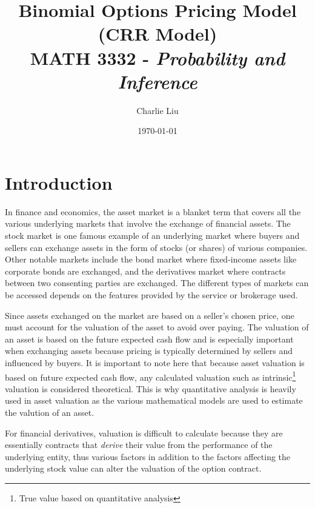 \documentclass[12pt, letterpaper]{article}\usepackage{float}
\begin{document}
\setlength\parindent{1cm}

\title{Binomial Options Pricing Model (CRR Model)\\
\large MATH 3332 - \textit{Probability and Inference}}
\author{Charlie Liu}
\date{\today}
\maketitle

\section*{Introduction}

In finance and economics, the asset market is a blanket term that covers all the various underlying markets that involve the exchange of financial assets.
The stock market is one famous example of an underlying market where buyers and sellers can exchange assets in the form of stocks (or shares) of various companies.
Other notable markets include the bond market where fixed-income assets like corporate bonds are exchanged, and the derivatives market where contracts between two consenting parties are exchanged.
The different types of markets can be accessed depends on the features provided by the service or brokerage used.

\medskip

Since assets exchanged on the market are based on a seller's chosen price, one must account for the valuation of the asset to avoid over paying.
The valuation of an asset is based on the future expected cash flow\cite{damodaran} and is especially important when exchanging assets because pricing is typically determined by sellers and influenced by buyers.
It is important to note here that because asset valuation is based on future expected cash flow, any calculated valuation such as intrinsic\footnote{True value based on quantitative analysis} valuation is considered theoretical.
This is why quantitative analysis is heavily used in asset valuation as the various mathematical models are used to estimate the valution of an asset.

\medskip

For financial derivatives, valuation is difficult to calculate because they are essentially contracts that \textit{derive} their value from the performance of the underlying entity\cite{derivativefinancewikipedia}, thus various factors in addition to the factors affecting the underlying stock value can alter the valuation of the option contract. 
\end{document}
